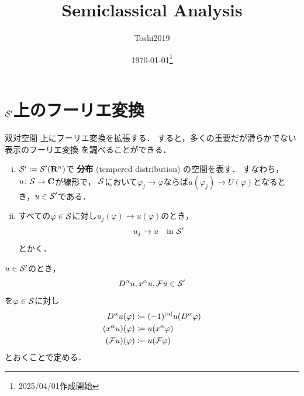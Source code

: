 \newcommand{\sgn}{\mathop{\mathrm{sgn}}\nolimits}
\newcommand{\diag}{\mathop{\mathrm{diag}}\nolimits}


\title{Semiclassical Analysis}
\author{Toshi2019}
\date{\today\footnote{2025/04/01作成開始}}

\maketitle
\tableofcontents


\section{\(\mathcal{S}'\)上のフーリエ変換}
双対空間
上にフーリエ変換を拡張する．
すると，多くの重要だが滑らかでない表示のフーリエ変換
を調べることができる．

\begin{DFN}
  \begin{enumerate}[(i)]
    \item \(\mathcal{S}'\coloneqq\mathcal{S}'(\mathbf{R}^n)\)で
    \textbf{分布} (tempered 
    distribution) の空間を表す．
    すなわち，\(u\colon \mathcal{S}\to\mathbf{C}\)が線形で，
    \(\mathcal{S}\)において\(\varphi_{j}\to\varphi\)ならば\(
      u(\varphi_{j})\to U(\varphi)
    \)となるとき，\(u\in\mathcal{S}'\)である．
    \item すべての\(\varphi\in\mathcal{S}\)に対し\(
      u_{j}(\varphi)\to u(\varphi)
    \)のとき，\[
      u_j\to u \quad\text{in \(\mathcal{S}'\)}
    \]とかく．
  \end{enumerate}
\end{DFN}
\begin{DFN}
  \(u\in\mathcal{S}'\)のとき，\[
    D^{\alpha}u, x^{\alpha}u, \mathcal{F} u\in\mathcal{S}'
  \]を\(\varphi\in\mathcal{S}\)に対し\begin{align}
      D^{\alpha}u(\varphi)&\coloneqq (-1)^{\lvert\alpha\rvert}u(D^{\alpha}\varphi)\\
      (x^{\alpha}u)(\varphi)&\coloneqq u(x^{\alpha}\varphi)\\
      (\mathcal{F} u)(\varphi)&\coloneqq u(\mathcal{F} \varphi)
  \end{align}とおくことで定める．
\end{DFN}

